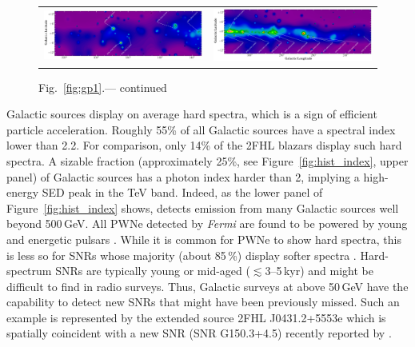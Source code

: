 \begin{figure}[!ht]
	\begin{center}
		\begin{tabular}{ll}
			        \includegraphics[angle=90,scale=.3]{Figures/Galactic_plane_CAR_3of4_sqrt_spectral_2FHL.eps}&
			        \includegraphics[angle=90,scale=.3]{Figures/Galactic_plane_CAR_4of4_sqrt_spectral_2FHL.eps}\\
			
		\end{tabular}
	\end{center}
	\begin{flushleft}
		{Fig.~\ref{fig:gp1}.}---  continued
	\end{flushleft}
\end{figure}

Galactic sources display on average hard spectra, which is a sign
of efficient particle acceleration. Roughly 55\% of all Galactic
sources have a spectral index lower than 2.2. For comparison, only 14\% of the { 2FHL} blazars
display such hard spectra. %
A sizable fraction (approximately 25\%, 
see Figure~\ref{fig:hist_index}, upper panel)
of Galactic sources has a photon
index harder than 2, implying a high-energy SED peak in the TeV band.
Indeed, as the lower panel of Figure~\ref{fig:hist_index} shows,
\lat{} detects emission from many Galactic sources well beyond 500\,GeV.
All PWNe detected by {\it Fermi} are found to be powered by young
and energetic pulsars \citep[age $\lesssim 30$\,kyr,][]{Acero13}.
While it is common for PWNe to show hard spectra, this is less
so for SNRs whose majority (about 85\,\%) display softer spectra
\citep{hewittSNRcat13}. Hard-spectrum SNRs are typically young or 
mid-aged ($\lesssim$3--5\,kyr)
and might be difficult to find in radio surveys. Thus, Galactic surveys
at above 50\,GeV have the capability to detect new SNRs that
might have been previously missed.
Such an example is represented by the extended source 
2FHL J0431.2+5553e which is spatially coincident with a 
new SNR (SNR G150.3+4.5) recently reported by \cite{Gao14}.

